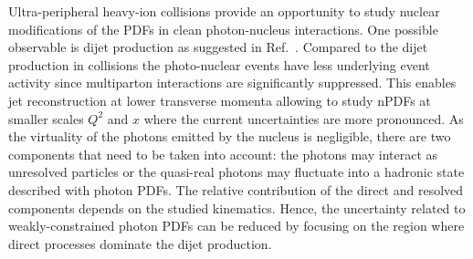 \documentclass[../report.tex]{subfiles}
\begin{document}
Ultra-peripheral heavy-ion collisions provide an opportunity to study nuclear modifications of the PDFs in clean photon-nucleus interactions. One possible observable is dijet production as suggested in Ref.~\cite{Strikman:2005yv}. Compared to the dijet production in \pPb collisions the photo-nuclear events have less underlying event activity since multiparton interactions are significantly suppressed. This enables jet reconstruction at lower transverse momenta allowing to study nPDFs at smaller scales $Q^2$ and $x$ where the current uncertainties are more pronounced. As the virtuality of the photons emitted by the nucleus is negligible, there are two components that need to be taken into account: the photons may interact as unresolved particles or the quasi-real photons may fluctuate into a hadronic state described with photon PDFs. The relative contribution of the direct and resolved components depends on the studied kinematics. Hence, the uncertainty related to weakly-constrained photon PDFs can be reduced by focusing on the region where direct processes dominate the dijet production.
\end{document}
